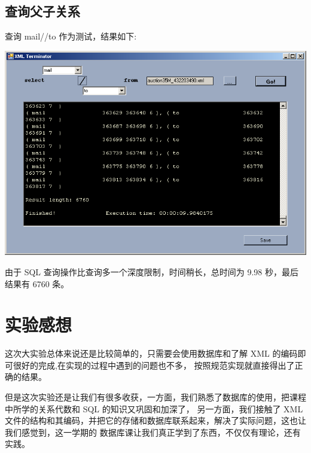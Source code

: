 \documentclass[10pt]{article}
\begin{document}
\begin{CJK}{UTF8}{gbsn}
\subsection{查询父子关系}
查询 mail//to 作为测试，结果如下:\\
\begin{center}
\includegraphics[width=0.9\linewidth]{test35_mailto_time.png}
\end{center}
由于 SQL 查询操作比查询多一个深度限制，时间稍长，总时间为 9.98 秒，最后结果有 6760 条。

\section{实验感想}
这次大实验总体来说还是比较简单的，只需要会使用数据库和了解 XML 的编码即可很好的完成,在实现的过程中遇到的问题也不多，
按照规范实现就直接得出了正确的结果。

但是这次实验还是让我们有很多收获，一方面，我们熟悉了数据库的使用，把课程中所学的关系代数和 SQL 的知识又巩固和加深了，
另一方面，我们接触了 XML 文件的结构和其编码，并把它的存储和数据库联系起来，解决了实际问题，这也让我们感觉到，这一学期的
数据库课让我们真正学到了东西，不仅仅有理论，还有实践。

\end{CJK}
\end{document}

